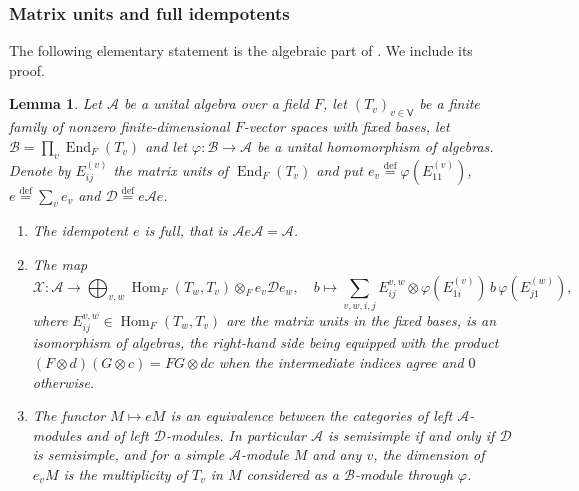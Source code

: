 \documentclass[leqno]{article}
\newcommand{\co}{\colon}
\newcommand{\ot}{\otimes}
\newcommand{\ov}{\overset}
\newtheorem{lemma}[thm]{Lemma}
\numberwithin{equation}{section}
\begin{document}
\subsubsection{Matrix units and full idempotents}
\label{zhu:subsec:peirce}

The following elementary statement is the algebraic part of \cite[Lemma 8.2 and Proposition 8.3 pp.~34--35]{Rie26b}. We include its proof.

\begin{lemma}
\label{zhu:lem:peirce}
Let $\mathcal A$ be a unital algebra over a field $F$, let $(T_v)_{v \in \mathsf V}$ be a finite family of nonzero finite-dimensional $F$-vector spaces with fixed bases, let $\mathcal B = \prod_{v} \operatorname{End}_F(T_v)$ and let $\varphi \co \mathcal B \to \mathcal A$ be a unital homomorphism of algebras. Denote by $E^{(v)}_{ij}$ the matrix units of $\operatorname{End}_F(T_v)$ and put $e_v \ov{\mathrm{def}}{=} \varphi(E^{(v)}_{11})$, $e \ov{\mathrm{def}}{=} \sum_v e_v$ and $\mathcal D \ov{\mathrm{def}}{=} e \mathcal A e$.
\begin{enumerate}
\item The idempotent $e$ is full, that is $\mathcal A e \mathcal A = \mathcal A$.
\item The map
\[
\mathcal X \co \mathcal A \to \bigoplus_{v,w} \operatorname{Hom}_F(T_w, T_v) \ot_F e_v \mathcal D e_w,\quad b \mapsto \sum_{v,w,i,j} E^{v,w}_{ij} \ot \varphi(E^{(v)}_{1i})\, b\, \varphi(E^{(w)}_{j1}),
\]
where $E^{v,w}_{ij} \in \operatorname{Hom}_F(T_w,T_v)$ are the matrix units in the fixed bases, is an isomorphism of algebras, the right-hand side being equipped with the product $(F \ot d)(G \ot c) = FG \ot dc$ when the intermediate indices agree and $0$ otherwise.
\item The functor $M \mapsto eM$ is an equivalence between the categories of left $\mathcal A$-modules and of left $\mathcal D$-modules. In particular $\mathcal A$ is semisimple if and only if $\mathcal D$ is semisimple, and for a simple $\mathcal A$-module $M$ and any $v$, the dimension of $e_v M$ is the multiplicity of $T_v$ in $M$ considered as a $\mathcal B$-module through $\varphi$.
\end{enumerate}
\end{lemma}
\end{document}
